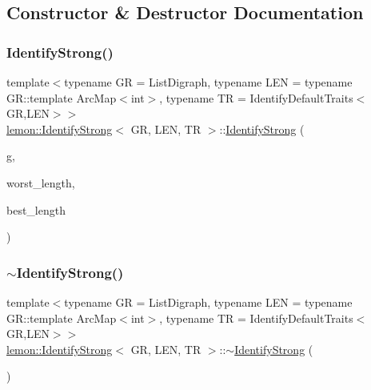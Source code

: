 \subsection{Constructor \& Destructor Documentation}
\mbox{\label{classlemon_1_1_identify_strong_a670f102e66ed601fb20c195a9111f636}} 
\subsubsection{\texorpdfstring{Identify\+Strong()}{IdentifyStrong()}}
{\footnotesize\ttfamily template$<$typename GR  = List\+Digraph, typename L\+EN  = typename G\+R\+::template Arc\+Map$<$int$>$, typename TR  = Identify\+Default\+Traits$<$\+G\+R,\+L\+E\+N$>$$>$ \\
\hyperlink{classlemon_1_1_identify_strong}{lemon\+::\+Identify\+Strong}$<$ GR, L\+EN, TR $>$\+::\hyperlink{classlemon_1_1_identify_strong}{Identify\+Strong} (\begin{DoxyParamCaption}\item[{const \hyperlink{classlemon_1_1_identify_strong_a8cf9250557b236f81e713bf32a048d49}{Digraph} \&}]{g,  }\item[{const \hyperlink{classlemon_1_1_identify_strong_ac2cd2d54ff91cc726fec23ff1534bd0c}{Length\+Map} \&}]{worst\+\_\+length,  }\item[{const \hyperlink{classlemon_1_1_identify_strong_ac2cd2d54ff91cc726fec23ff1534bd0c}{Length\+Map} \&}]{best\+\_\+length }\end{DoxyParamCaption})\hspace{0.3cm}{\ttfamily [inline]}}

\mbox{\label{classlemon_1_1_identify_strong_aada7f022421e480afa01553ccd3ef246}} 
\subsubsection{\texorpdfstring{$\sim$\+Identify\+Strong()}{~IdentifyStrong()}}
{\footnotesize\ttfamily template$<$typename GR  = List\+Digraph, typename L\+EN  = typename G\+R\+::template Arc\+Map$<$int$>$, typename TR  = Identify\+Default\+Traits$<$\+G\+R,\+L\+E\+N$>$$>$ \\
\hyperlink{classlemon_1_1_identify_strong}{lemon\+::\+Identify\+Strong}$<$ GR, L\+EN, TR $>$\+::$\sim$\hyperlink{classlemon_1_1_identify_strong}{Identify\+Strong} (\begin{DoxyParamCaption}{ }\end{DoxyParamCaption})\hspace{0.3cm}{\ttfamily [inline]}}



